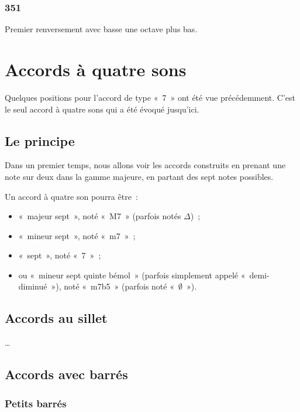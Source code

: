 \documentclass[11pt]{article}
\begin{document}
\subsubsection{351}

Premier renversement avec basse une octave plus bas.



\section{Accords à quatre sons}

Quelques positions pour l’accord de type «~7~» ont été vue précédemment. C’est
le seul accord à quatre sons qui a été évoqué jusqu’ici.

\subsection{Le principe}

Dans un premier temps, nous allons voir les accords construits en prenant
une note sur deux dans la gamme majeure, en partant des sept notes possibles.

Un accord à quatre son pourra être :

\begin{itemize}
\item «~majeur sept~», noté «~M7~» (parfois notés $\Delta$)~;
\item «~mineur sept~», noté «~m7~»~;
\item «~sept~», noté «~7~»~;
\item ou «~mineur sept quinte bémol~» (parfois simplement appelé
    «~demi-diminué~»), noté «~m7b5~» (parfois noté «~$\emptyset$~»).
\end{itemize}

\subsection{Accords au sillet}

\ldots


\subsection{Accords avec barrés}

\subsubsection{Petits barrés}
\end{document}
